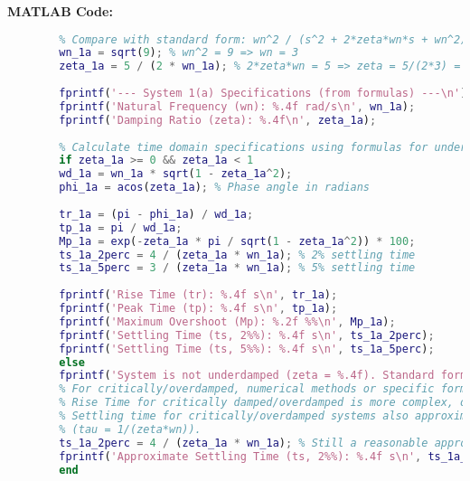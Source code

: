 \documentclass{article}
\begin{document}
	\textbf{MATLAB Code:}
	\begin{lstlisting}[language=Matlab, caption=MATLAB Code for Problem 1(a) (Using Formulas)]
		% System: C(s)/R(s) = 9/(s^2+5s+9)
		% Compare with standard form: wn^2 / (s^2 + 2*zeta*wn*s + wn^2)
		wn_1a = sqrt(9); % wn^2 = 9 => wn = 3
		zeta_1a = 5 / (2 * wn_1a); % 2*zeta*wn = 5 => zeta = 5/(2*3) = 5/6
		
		fprintf('--- System 1(a) Specifications (from formulas) ---\n');
		fprintf('Natural Frequency (wn): %.4f rad/s\n', wn_1a);
		fprintf('Damping Ratio (zeta): %.4f\n', zeta_1a);
		
		% Calculate time domain specifications using formulas for underdamped system
		if zeta_1a >= 0 && zeta_1a < 1
		wd_1a = wn_1a * sqrt(1 - zeta_1a^2);
		phi_1a = acos(zeta_1a); % Phase angle in radians
		
		tr_1a = (pi - phi_1a) / wd_1a;
		tp_1a = pi / wd_1a;
		Mp_1a = exp(-zeta_1a * pi / sqrt(1 - zeta_1a^2)) * 100;
		ts_1a_2perc = 4 / (zeta_1a * wn_1a); % 2% settling time
		ts_1a_5perc = 3 / (zeta_1a * wn_1a); % 5% settling time
		
		fprintf('Rise Time (tr): %.4f s\n', tr_1a);
		fprintf('Peak Time (tp): %.4f s\n', tp_1a);
		fprintf('Maximum Overshoot (Mp): %.2f %%\n', Mp_1a);
		fprintf('Settling Time (ts, 2%%): %.4f s\n', ts_1a_2perc);
		fprintf('Settling Time (ts, 5%%): %.4f s\n', ts_1a_5perc);
		else
		fprintf('System is not underdamped (zeta = %.4f). Standard formulas for tp, Mp not applicable.\n', zeta_1a);
		% For critically/overdamped, numerical methods or specific formulas apply for tr/ts
		% Rise Time for critically damped/overdamped is more complex, often 10-90%
		% Settling time for critically/overdamped systems also approximates 3 or 4 time constants
		% (tau = 1/(zeta*wn)).
		ts_1a_2perc = 4 / (zeta_1a * wn_1a); % Still a reasonable approximation for first-order equivalent.
		fprintf('Approximate Settling Time (ts, 2%%): %.4f s\n', ts_1a_2perc);
		end
		

\end{lstlisting}
\end{document}
